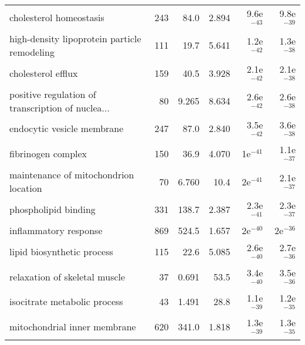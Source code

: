 \begin{longtable}{lrrrrr}
                           cholesterol homeostasis &                     243 &                    84.0 &      2.894 &         9.6e$^{-43}$ &         9.8e$^{-39}$ \\
      high-density lipoprotein particle remodeling &                     111 &                    19.7 &      5.641 &         1.2e$^{-42}$ &         1.3e$^{-38}$ \\
                                cholesterol efflux &                     159 &                    40.5 &      3.928 &         2.1e$^{-42}$ &         2.1e$^{-38}$ \\
 positive regulation of transcription of nuclea... &                      80 &                   9.265 &      8.634 &         2.6e$^{-42}$ &         2.6e$^{-38}$ \\
                        endocytic vesicle membrane &                     247 &                    87.0 &      2.840 &         3.5e$^{-42}$ &         3.6e$^{-38}$ \\
                                fibrinogen complex &                     150 &                    36.9 &      4.070 &           1e$^{-41}$ &         1.1e$^{-37}$ \\
             maintenance of mitochondrion location &                      70 &                   6.760 &       10.4 &           2e$^{-41}$ &         2.1e$^{-37}$ \\
                              phospholipid binding &                     331 &                   138.7 &      2.387 &         2.3e$^{-41}$ &         2.3e$^{-37}$ \\
                             inflammatory response &                     869 &                   524.5 &      1.657 &           2e$^{-40}$ &           2e$^{-36}$ \\
                        lipid biosynthetic process &                     115 &                    22.6 &      5.085 &         2.6e$^{-40}$ &         2.7e$^{-36}$ \\
                     relaxation of skeletal muscle &                      37 &                   0.691 &       53.5 &         3.4e$^{-40}$ &         3.5e$^{-36}$ \\
                      isocitrate metabolic process &                      43 &                   1.491 &       28.8 &         1.1e$^{-39}$ &         1.2e$^{-35}$ \\
                      mitochondrial inner membrane &                     620 &                   341.0 &      1.818 &         1.3e$^{-39}$ &         1.3e$^{-35}$ \\

\end{longtable}
